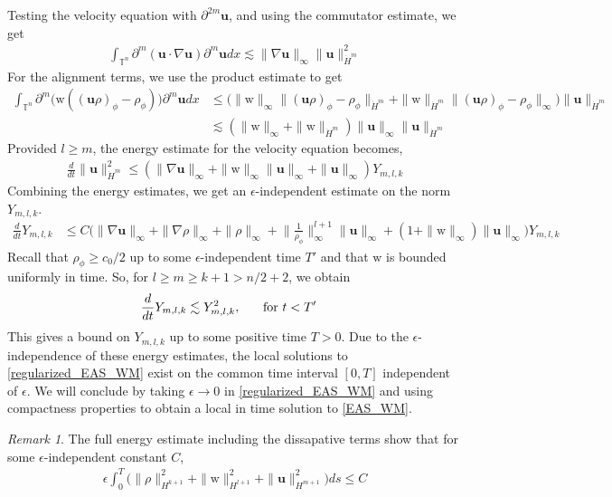 \documentclass[11pt,letterpaper]{amsart}
\theoremstyle{plain}
\theoremstyle{definition}
\theoremstyle{remark}
\newtheorem{remark}[THEOREM]{Remark}
\newcommand{\T}{\ensuremath{\mathbb{T}}}   %
\renewcommand{\geq}{\geqslant}
\renewcommand{\leq}{\leqslant}
\def\T{\mathbb{T}}
\def\Hmdot{\dot{H}^m}
\def\u{\textbf{u}}
\def \wt {\mathrm{w}}
\begin{document}
Testing the velocity equation with $\partial^{2m} \u$, and using the commutator estimate, we get 
\begin{align*}
    \int_{\T^n} \partial^m (\u \cdot \nabla \u ) \partial^m \u dx \lesssim \|\nabla \u\|_{\infty} \|\u\|_{\Hmdot}^2
\end{align*}
For the alignment terms, we use the product estimate to get  
\begin{align*}
    \int_{\T^n} \partial^m \Big( \wt ( (\u\rho)_{\phi} - \rho_{\phi} ) \Big) \partial^m \u dx 
        &\leq \big(\| \wt \|_{\infty} \|(\u\rho)_{\phi} - \rho_{\phi}\|_{\Hmdot} 
            + \| \wt \|_{\Hmdot} \|(\u\rho)_{\phi} - \rho_{\phi} \|_{\infty} \big) \|\u\|_{\Hmdot}  \\
        &\lesssim (\| \wt \|_{\infty} + \| \wt \|_{\Hmdot}) \|\u\|_{\infty} \|\u\|_{\Hmdot} 
\end{align*}
Provided $l \geq m$, the energy estimate for the velocity equation becomes, 
\begin{align*}
    \frac{d}{dt} \|\u\|_{\Hmdot}^2 \leq (\|\nabla \u\|_{\infty} + \| \wt \|_{\infty} \|\u\|_{\infty} + \|\u\|_{\infty}) Y_{m,l,k}
\end{align*}
Combining the energy estimates, we get an $\epsilon$-independent estimate on the norm $Y_{m,l,k}$.
\begin{align*}
    \frac{d}{dt} Y_{m,l,k} &\leq C \Big(\|\nabla \u\|_{\infty} + \|\nabla \rho\|_{\infty} + \|\rho\|_{\infty} 
        + \Big\| \frac{1}{\rho_{\phi}} \Big\|_{\infty}^{l+1} \|\u\|_{\infty} 
        + (1 + \|\wt\|_{\infty}) \| \u \|_{\infty} \Big) Y_{m,l,k} 
\end{align*}
Recall that $\rho_{\phi} \geq c_0/2$ up to some $\epsilon$-independent time $T'$ and that $\wt$ is bounded uniformly in time.
So, for $l \geq m \geq k+1 > n/2 + 2$, we obtain
\begin{align*}
    \frac{d}{dt} Y_{m,l,k} &\lesssim Y_{m,l, k}^{2},  \hspace{5mm} \text{ for } t < T'
\end{align*}
This gives a bound on $Y_{m,l,k}$ up to some positive time $T>0$.
Due to the $\epsilon$-independence of these energy estimates, 
the local solutions to \eqref{regularized_EAS_WM} exist on the common time 
interval $[0,T]$ independent of $\epsilon$.  
We will conclude by taking $\epsilon \to 0$ 
in \eqref{regularized_EAS_WM} and using compactness properties to obtain 
a local in time solution to \eqref{EAS_WM}.

\begin{remark}
    \label{est_on_dissapative_terms}
    The full energy estimate including the dissapative terms show that for some 
    $\epsilon$-independent constant $C$, 
    \begin{align*}
        \epsilon \int_0^T \big( \|\rho\|_{H^{k+1}}^2 + \| \wt \|_{H^{l+1}}^2 + \|\u\|_{H^{m+1}}^2 \big) ds \leq C 
    \end{align*}
\end{remark}
\end{document}
